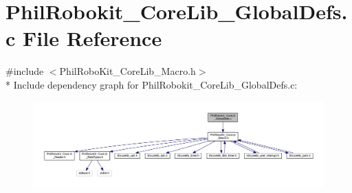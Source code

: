 \section{Phil\-Robokit\-\_\-\-Core\-Lib\-\_\-\-Global\-Defs.\-c File Reference}
\label{_phil_robokit___core_lib___global_defs_8c}
{\ttfamily \#include $<$Phil\-Robo\-Kit\-\_\-\-Core\-Lib\-\_\-\-Macro.\-h$>$}\\*
Include dependency graph for Phil\-Robokit\-\_\-\-Core\-Lib\-\_\-\-Global\-Defs.\-c\-:\nopagebreak
\begin{figure}[H]
\begin{center}
\leavevmode
\includegraphics[width=350pt]{_phil_robokit___core_lib___global_defs_8c__incl}
\end{center}
\end{figure}
